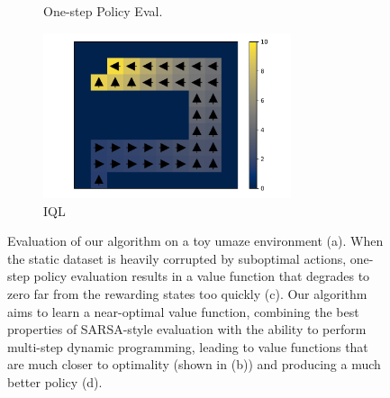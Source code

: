 \documentclass{article} %
\def\ourname{IQL\xspace}
\begin{document}
\begin{figure}
\begin{subfigure}{0.235\textwidth}
    \caption{One-step Policy Eval.}
\end{subfigure}%
\begin{subfigure}{0.28\textwidth}
    \centering
    \includegraphics[width=0.8\textwidth]{images/maze/maze_1.pdf}
    \caption{\ourname}
\end{subfigure}
\caption{Evaluation of our algorithm on a toy umaze environment (a).
When the static dataset is heavily corrupted by suboptimal actions, one-step policy evaluation
results in a value function that degrades to zero far from the rewarding states too quickly (c). Our algorithm aims to learn a near-optimal value function, combining the best properties of SARSA-style evaluation with the ability to perform multi-step dynamic programming, leading to value functions that are much closer to optimality (shown in (b)) and producing a much better policy (d).\label{fig:illustratiev}}
\end{figure}
\end{document}
